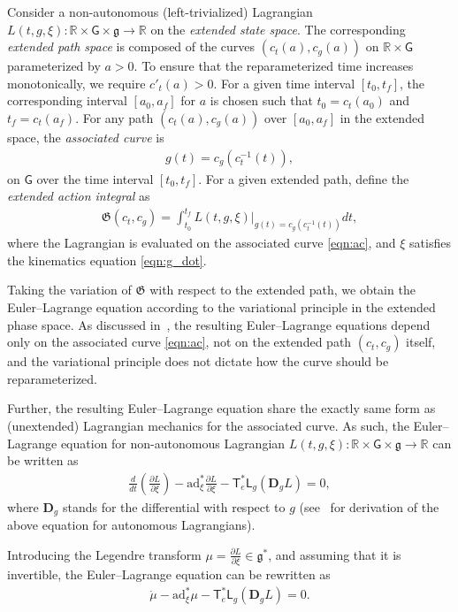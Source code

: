 \documentclass[letterpaper, 10pt, conference]{ieeeconf}
\newcommand{\parenth}[1]{\ensuremath{\left( #1 \right)}}
\newcommand{\deriv}[2]{\ensuremath{\frac{\partial #1}{\partial #2}}}
\newcommand{\G}{\ensuremath{\mathsf{G}}}
\newcommand{\T}{\ensuremath{\mathsf{T}}}
\renewcommand{\L}{\ensuremath{\mathsf{L}}}
\renewcommand{\Re}{\ensuremath{\mathbb{R}}}
\newcommand{\D}{\ensuremath{\mathbf{D}}}
\newcommand{\ad}{\ensuremath{\mathrm{ad}}}
\newcommand{\g}{\ensuremath{\mathfrak{g}}}
\begin{document}
Consider a non-autonomous (left-trivialized) Lagrangian $L(t,g,\xi):\Re\times\G\times\g\rightarrow \Re$ on the \textit{extended state space}.
The corresponding \textit{extended path space} is composed of the curves $(c_t(a),c_g(a))$ on $\Re\times \G$ parameterized by $a>0$.
To ensure that the reparameterized time increases monotonically, we require $c'_t(a) > 0$. 
For a given time interval $[t_0,t_f]$, the corresponding interval $[a_0,a_f]$ for $a$ is chosen such that $t_0=c_t(a_0)$ and $t_f=c_t(a_f)$.
For any path $(c_t(a),c_g(a))$ over $[a_0,a_f]$ in the extended space, the \textit{associated curve} is 
\begin{align}
    g(t) = c_g(c_t^{-1}(t)),\label{eqn:ac}
\end{align}
on $\G$ over the time interval $[t_0,t_f]$.
For a given extended path, define the \textit{extended action integral} as
\begin{align}
    \mathfrak{G}(c_t,c_g) = \int_{t_0}^{t_f} L(t,g,\xi)\bigg|_{g(t) = c_g(c_t^{-1}(t))} dt,\label{eqn:AI}
\end{align}
where the Lagrangian is evaluated on the associated curve \eqref{eqn:ac}, and $\xi$ satisfies the kinematics equation  \eqref{eqn:g_dot}.

Taking the variation of $\mathfrak{G}$ with respect to the extended path, we obtain the Euler--Lagrange equation according to the variational principle in the extended phase space. 
As discussed in~\cite[Sec. 4.2.2]{MarWesAN01}, the resulting Euler--Lagrange equations depend only on the associated curve \eqref{eqn:ac}, not on the extended path $(c_t,c_g)$ itself, and the variational principle does not dictate how the curve should be reparameterized. 

Further, the resulting Euler--Lagrange equation share the exactly same form as (unextended) Lagrangian mechanics for the associated curve. 
As such, the Euler--Lagrange equation for non-autonomous Lagrangian $L(t,g,\xi):\Re\times\G\times\g\rightarrow \Re$ can be written as
\begin{align}
    \frac{d}{dt}\!\parenth{\deriv{L}{\xi}} - \ad^*_\xi \deriv{L}{\xi} - \T^*_e \L_g (\D_g L) = 0, \label{eqn:EL}
\end{align}
where $\D_g$ stands for the differential with respect to $g$ (see~\cite[Sec. 8.6.3]{LeeLeo17} for derivation of the above equation for autonomous Lagrangians).

Introducing the Legendre transform $\mu = \deriv{L}{\xi} \in\g^*$, and assuming that it is invertible, the Euler--Lagrange equation can be rewritten as
\begin{align}
    \dot \mu - \ad^*_{\xi} \mu - \T^*_e \L_g (\D_g L) = 0. \label{eqn:HE}
\end{align}
\end{document}
